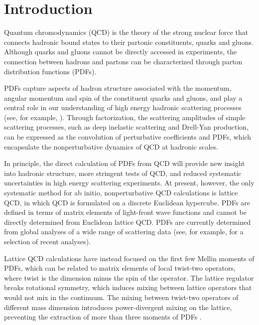 \section{Introduction}

Quantum chromodynamics (QCD) is the theory of the
strong nuclear force that connects hadronic bound states to their partonic 
constituents, quarks and gluons. Although quarks and gluons cannot be 
directly accessed in experiments, the connection between hadrons 
and partons can be characterized through parton 
distribution functions (PDFs).

PDFs capture aspects of hadron structure associated with the momentum, 
angular momentum and spin of the constituent quarks and gluons, and play a 
central role in our understanding of high energy hadronic scattering processes  
(see, for example, 
\cite{Brock:1993sz,Sterman:1994ce,Collins:2011zzd}). Through factorization, the 
scattering 
amplitudes of simple scattering processes, such as deep inelastic scattering 
and Drell-Yan production, can be expressed as the convolution of perturbative 
coefficients and PDFs, which encapsulate the nonperturbative dynamics of QCD at 
hadronic scales.

In principle, the direct calculation of PDFs from QCD will provide new insight 
into hadronic structure, more stringent tests of QCD, and reduced systematic 
uncertainties in high energy scattering experiments. At present, however, the 
only systematic method for ab initio, nonperturbative QCD calculations is 
lattice QCD, in which QCD is formulated on a discrete Euclidean hypercube. PDFs 
are defined in terms of matrix elements of light-front wave functions and cannot 
be directly determined from Euclidean lattice QCD. PDFs are currently
determined from global analyses of a wide range of scattering data (see, for 
example, 
\cite{Arbabifar:2013tma,Ball:2013lla,Jimenez-Delgado:2013boa,
Jimenez-Delgado:2014xza,Dulat:2015mca, 
Hou:2016sho,Shahri:2016uzl} for a selection of recent analyses).

Lattice QCD calculations have instead focused on the first 
few Mellin moments of PDFs, which can be related to matrix elements of local 
twist-two operators, where twist is the dimension minus the spin of the 
operator. The lattice 
regulator breaks rotational symmetry, which induces mixing between lattice 
operators that would not mix in the continuum. The mixing between twist-two 
operators of different 
mass dimension introduces power-divergent mixing on the lattice, preventing the 
extraction of more than three moments of PDFs 
\cite{Detmold:2001dv,Detmold:2003rq}.

